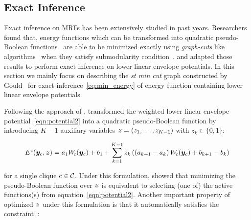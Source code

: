 \subsection{Exact Inference}
\label{sec:exact_inference}

Exact inference on MRFs has been extensively studied in past
years. Researchers found that, energy functions which can be
transformed into quadratic pseudo-Boolean
functions~\cite{Ishikawa:PAMI03,Ishikawa:CVPR09,Rother:CVPR09}
are able to be minimized exactly using \emph{graph-cuts} like
algorithms~\cite{Freedman:CVPR05,Hammer:1965} when they satisfy
submodularity condition~\cite{Boros:MATH02}.
 and  adapted those
results to perform exact inference on lower linear envelope
potentials. In this section we mainly focus on describing the
\emph{st min cut} graph constructed by
Gould~\cite{Gould:ICML2011,gouldlearning} for exact
inference~\eqref{eq:min_energy} of energy function containing
lower linear envelope potentials.

Following the approach of ,
 transformed the weighted
lower linear envelope potential~\eqref{eqn:potential2} into a
quadratic pseudo-Boolean function by introducing $K-1$ auxiliary
variables ${\bm{z}} = \left(z_1, \ldots, z_{K-1}\right)$ with $z_k\in
\{0,1\}$:

\begin{align}
  E^c({\bm{y}}_c, {\bm{z}}) = a_1 W_{\!c}({\bm{y}}_c) + b_1
  {}+ \sum_{k = 1}^{K-1} z_k \left( \left(a_{k+1} - a_k\right) W_{\!c}({\bm{y}}_c) + b_{k+1} - b_k \right)
  \label{eqn:binary_concave_z}
\end{align}

\noindent for a single clique $c \in {\mathcal{C}}$. Under this formulation,
 showed that minimizing
the pseudo-Boolean function over ${\bm{z}}$ is equivalent to selecting
(one of) the active functions(s) from
equation~\eqref{eqn:potential2}. Another important property of
optimized ${\bm{z}}$ under this formulation is that it
automatically satisfies the constraint~\cite{gouldlearning}: 

